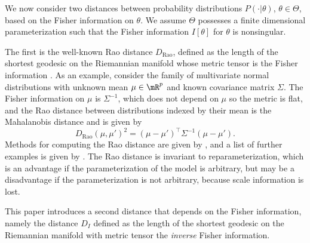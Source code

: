 \documentclass[preprint,12pt,authoryear]{elsarticle}
\DeclarePairedDelimiter{\norm}{\lVert}{\rVert}
\def\half{{\scriptstyle\frac{1}{2}}}
\begin{document}
We now consider two distances between probability distributions $P(\cdot|\theta)$, $\theta\in\Theta$, based on the Fisher information on $\theta$.
We assume $\Theta$ possesses a finite dimensional parameterization such that the Fisher information $I[\theta]$ for $\theta$ is nonsingular.


The first is the well-known Rao distance $D_\text{Rao}$, defined as the length of the shortest geodesic on the Riemannian manifold whose metric tensor is the Fisher information \citep{rao45,am81,amari85}. As an example, consider the family of multivariate normal distributions with unknown mean $\mu\in\mR^p$ and known covariance matrix $\Sigma$. The Fisher information on $\mu$ is $\Sigma^{-1}$, which does not depend on $\mu$ so the metric is flat, and the Rao distance between distributions indexed by their mean is the Mahalanobis distance and is given by
\[  D_\text{Rao}(\mu,\mu')^2=(\mu-\mu')^\top\Sigma^{-1}(\mu-\mu'). \]
Methods for computing the Rao distance are given by \citet{am81}, and a list of further examples is given by \citet{rao87}.
The Rao distance is invariant to reparameterization, which is an advantage if the parameterization of the model is arbitrary, but may be a disadvantage if the parameterization is not arbitrary, because scale information is lost.


This paper introduces a second distance that depends on the Fisher information, namely the distance $D_I$ defined as the length of the shortest geodesic on the Riemannian manifold with metric tensor the {\em inverse} Fisher information. 

\end{document}
